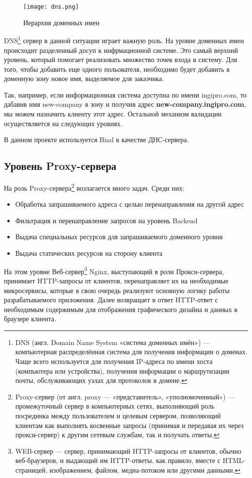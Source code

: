 \begin{figure}[H]
\centering
\texttt{[image: dns.png]}
\caption{Иерархия доменных имен}
\label{img:domains}
\end{figure}

DNS\footnote{%
	DNS (англ. Domain Name System «система доменных имён») — компьютерная распределённая система для получения информации о доменах. Чаще всего используется для получения IP-адреса по имени хоста (компьютера или устройства), получения информации о маршрутизации почты, обслуживающих узлах для протоколов в домене.
} сервер в данной ситуации играет важную роль. На уровне доменных имен происходит разделенный досуп к инфрмационной системе. Это самый верхний уровень, который помогает реализовать множество точек входа в систему. Для того, чтобы добавить еще одного польователя, необходимо будет добавить в доменную зону новое имя, выделяемое для заказчика.

Так, например, если информационная система доступна по имени ingipro.com, то дабавив имя new-company в зону и получив адрес {\bfseries new-company.ingipro.com}, мы можем назначить клиенту этот адрес. Остальной механизм валидации осуществляется на следующих уровнях. 

В данном проекте используется Bind в качестве ДНС-сервера.

\subsection{Уровень Proxy-сервера}

На роль Proxy-сервера\footnote{%
	Proxy-сервер (от англ. proxy — «представитель», «уполномоченный») — промежуточный сервер в компьютерных сетях, выполняющий роль посредника между пользователем и целевым сервером, позволяющий клиентам как выполнять косвенные запросы (принимая и передавая их через прокси-сервер) к другим сетевым службам, так и получать ответы.
} возлагается много задач. Среди них:
\begin{itemize}
\item Обработка запрашиваемого адреса с целью перенаправления на другой адрес
\item Фильтрация и перенаправление запросов на уровень Backend
\item Выдача специальных ресурсов для запрашиваемого доменного уровня
\item Выдача статических ресурсов на сторону клиента
\end{itemize}

На этом уровне Веб-сервер\footnote{%
	WEB-сервер --- сервер, принимающий HTTP-запросы от клиентов, обычно веб-браузеров, и выдающий им HTTP-ответы, как правило, вместе с HTML-страницей, изображением, файлом, медиа-потоком или другими данными.
} Nginx, выступающий в роли Прокси-сервера, принимает HTTP-запросы от клиентов, перенаправляет их на необходимые микросервисы, которые в свою очередь реализуют основную логику работы разрабатываемого приложения. Далее возвращает в ответ HTTP-ответ с необходимым содержимым для отображения графического дизайна и данных в браузере клиента.


